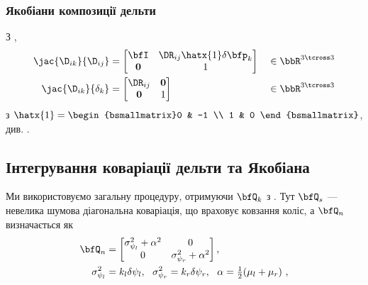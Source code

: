 \subsubsection{Якобіани композиції дельти}
%
З 
, %
%
\begin{subequations}\label{equ:jac_composition_DD}
\begin{align}
\jac{\D_{ik}}{\D_{ij}} &= \begin{bmatrix}
\bfI & \DR_{ij}\hatx{1}\delta\bfp_k \\
\bf0 & 1
\end{bmatrix}
&&\in \bbR^{3\tcross3}
\\
\jac{\D_{ik}}{\delta_k} &= \begin{bmatrix}
\DR_{ij} & \bf0 \\
\bf0        & 1
\end{bmatrix}
&&\in \bbR^{3\tcross3}
\end{align}
\end{subequations}
%
з $\hatx{1}=\begin{bsmallmatrix}0 & -1 \\ 1 & 0
\end{bsmallmatrix}$, див. 
.
%

\subsection{Інтегрування коваріації дельти та Якобіана}

Ми використовуємо загальну процедуру, отримуючи $\bfQ_k$ з 
.
Тут $\bfQ_s$ — невелика шумова діагональна коваріація, що враховує ковзання коліс, а $\bfQ_n$ визначається як
%
\begin{align}
\label{equ:diff_drive_meas_cov}
\bfQ_n &=
\begin{bmatrix}
\sigma^2_{\psi_l}+\alpha^2 & 0\\
0 & \sigma^2_{\psi_r}+\alpha^2
\end{bmatrix}, \\
\sigma_{\psi_l}^2&=k_l \delta\psi_l,~~\sigma_{\psi_r}^2=k_r \delta\psi_r,~~\alpha=\tfrac12(\mu_l+\mu_r)  \notag
~,
\end{align}
%


